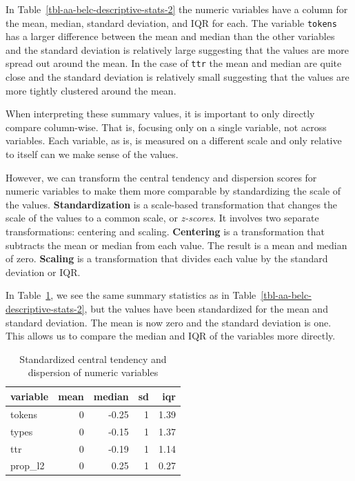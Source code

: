 \documentclass[
  letterpaper,
  DIV=11,
  numbers=noendperiod]{scrreport}
\theoremstyle{definition}
\theoremstyle{remark}
\begin{document}
In Table~\ref{tbl-aa-belc-descriptive-stats-2} the numeric variables
have a column for the mean, median, standard deviation, and IQR for
each. The variable \texttt{tokens} has a larger difference between the
mean and median than the other variables and the standard deviation is
relatively large suggesting that the values are more spread out around
the mean. In the case of \texttt{ttr} the mean and median are quite
close and the standard deviation is relatively small suggesting that the
values are more tightly clustered around the mean.

When interpreting these summary values, it is important to only directly
compare column-wise. That is, focusing only on a single variable, not
across variables. Each variable, as is, is measured on a different scale
and only relative to itself can we make sense of the values.

However, we can transform the central tendency and dispersion scores for
numeric variables to make them more comparable by standardizing the
scale of the values. \textbf{Standardization} is a scale-based
transformation that changes the scale of the values to a common scale,
or \emph{z-scores}. It involves two separate transformations: centering
and scaling. \textbf{Centering} is a transformation that subtracts the
mean or median from each value. The result is a mean and median of zero.
\textbf{Scaling} is a transformation that divides each value by the
standard deviation or IQR.

In Table~\ref{tbl-aa-belc-descriptive-stats-standardized}, we see the
same summary statistics as in
Table~\ref{tbl-aa-belc-descriptive-stats-2}, but the values have been
standardized for the mean and standard deviation. The mean is now zero
and the standard deviation is one. This allows us to compare the median
and IQR of the variables more directly.

\hypertarget{tbl-aa-belc-descriptive-stats-standardized}{}
\begin{table}
\caption{\label{tbl-aa-belc-descriptive-stats-standardized}Standardized central tendency and dispersion of numeric variables }\tabularnewline

\centering
\begin{tabular}{l|r|r|r|r}
\hline
variable & mean & median & sd & iqr\\
\hline
tokens & 0 & -0.25 & 1 & 1.39\\
\hline
types & 0 & -0.15 & 1 & 1.37\\
\hline
ttr & 0 & -0.19 & 1 & 1.14\\
\hline
prop\_l2 & 0 & 0.25 & 1 & 0.27\\
\hline
\end{tabular}
\end{table}
\end{document}
